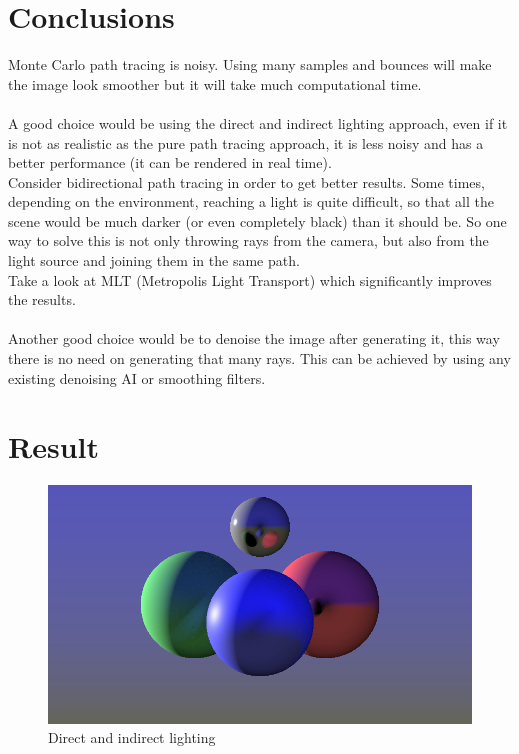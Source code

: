 \documentclass{article}
\begin{document}
\section{Conclusions}

Monte Carlo path tracing is noisy. Using many samples and bounces will make the image look smoother but it will take much computational time.
\\\\
A good choice would be using the direct and indirect lighting approach, even if it is not as realistic as the pure path tracing approach, it is less noisy and has a better performance (it can be rendered in real time).
\\
Consider bidirectional path tracing in order to get better results. Some times, depending on the environment, reaching a light is quite difficult, so that all the scene would be much darker (or even completely black) than it should be. So one way to solve this is not only throwing rays from the camera, but also from the light source and joining them in the same path.
\\
Take a look at MLT (Metropolis Light Transport) which significantly improves the results.
\\\\
Another good choice would be to denoise the image after generating it, this way there is no need on generating that many rays. This can be achieved by using any existing denoising AI or smoothing filters.

\section{Result}

\begin{figure}[h]
\centering
\includegraphics[scale=0.5]{raytracingGI.png}
\caption{Direct and indirect lighting}
\label{fig:Direct and indirect lighting}
\end{figure}
\end{document}
